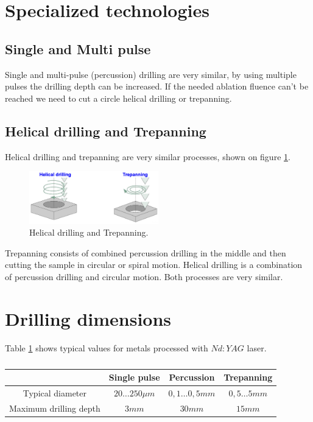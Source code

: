 \section{Specialized technologies}
\subsection{Single and Multi pulse}
Single and multi-pulse (percussion) drilling are very similar, by using multiple pulses the drilling depth can be increased. 
If the needed ablation fluence can't be reached we need to cut a circle \pd helical drilling or trepanning.


\subsection{Helical drilling and Trepanning}
Helical drilling and trepanning are very similar processes, shown on figure \ref{fig:held}.
\begin{figure}[h!]
    \centering
    \includegraphics[width=0.5\textwidth]{slike/helical.png}
    \caption{Helical drilling and Trepanning. \sln}
    \label{fig:held}
\end{figure}

Trepanning consists of combined percussion drilling in the middle and then cutting the sample in circular or spiral motion.
Helical drilling is a combination of percussion drilling and circular motion. Both processes are very similar.

\section{Drilling dimensions}
Table \ref{tab:ddims} shows typical values for metals processed with $Nd:YAG$ laser. 

\begin{table}[h!]
    \begin{tabular}{|c|c|c|c|}
        \hline
                            & Single pulse      & Percussion &              Trepanning \\
        \hline
        Typical diameter    & $20\dots 250 \mu m$ & $0,1 \dots 0,5 mm $&$ 0,5 \dots 5 mm$ \\
        \hline
        Maximum drilling depth & $3 mm$ & $ 30 mm$ & $15 mm$ \\
        \hline
    \end{tabular}
    \caption{}
    \label{tab:ddims}
\end{table}

